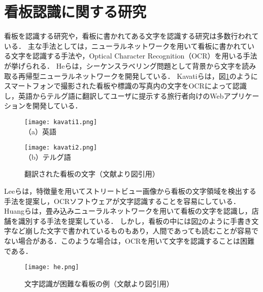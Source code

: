 \section{看板認識に関する研究}
  看板を認識する研究や，看板に書かれてある文字を認識する研究は多数行われている\cite{Krishna:2018, Sasaki:2014}．
  主な手法としては，ニューラルネットワークを用いて看板に書かれている文字を認識する手法や，Optical Character Recognition（OCR）を用いる手法が挙げられる．
  Heらは，シーケンスラベリング問題として背景から文字を読み取る再帰型ニューラルネットワークを開発している\cite{He:2016}．
  Kavatiらは，図\ref{figure:kavati}のようにスマートフォンで撮影された看板や標識の写真内の文字をOCRによって認識し，英語からテルグ語に翻訳してユーザに提示する旅行者向けのWebアプリケーションを開発している\cite{Kavati:2017}．
  \begin{figure}[tb]
    \begin{minipage}{0.49\hsize}
      \begin{center}
        \texttt{[image: kavati1.png]}\\
        \small{（a）英語}
      \end{center}
    \end{minipage}
    \begin{minipage}{0.49\hsize}
      \begin{center}
        \texttt{[image: kavati2.png]}\\
        \small{（b）テルグ語}
      \end{center}
    \end{minipage}
    \vspace{2pt}
    \caption{翻訳された看板の文字（文献\cite{Kavati:2017}より図引用）}
    \label{figure:kavati}
  \end{figure}
  Leeらは，特徴量を用いてストリートビュー画像から看板の文字領域を検出する手法を提案し，OCRソフトウェアが文字認識することを容易にしている\cite{Lee:2016}．
  Huangらは，畳み込みニューラルネットワークを用いて看板の文字を認識し，店舗を識別する手法を提案している\cite{Huang:2017}．
  しかし，看板の中には図\ref{figure:he}のように手書き文字など崩した文字で書かれているものもあり，人間であっても読むことが容易でない場合がある．このような場合は，OCRを用いて文字を認識することは困難である．
  \begin{figure}[tb]
    \centerline{\texttt{[image: he.png]}}
    \caption{文字認識が困難な看板の例（文献\cite{He:2016}より図引用）}
    \label{figure:he}
  \end{figure}
  
